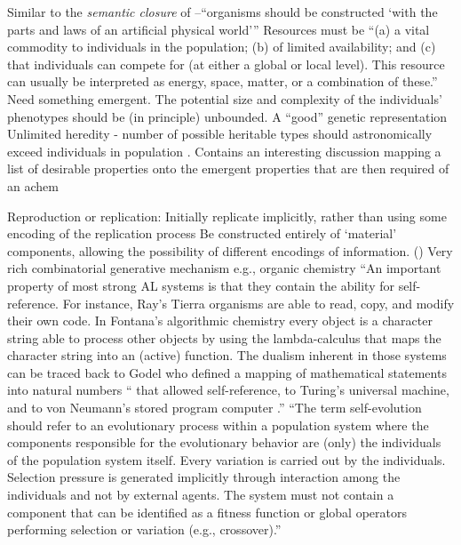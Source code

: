 Similar to the \emph{semantic closure} of \cite{Pattee1995a}--``organisms should be constructed `with the parts and laws of an artificial physical world''' \cite{Taylor2001}
Resources must be ``(a) a vital commodity to individuals in the population; (b) of limited availability; and (c) that individuals can compete for (at either a global or local level). This resource can usually be interpreted as energy, space, matter, or a combination of these.'' \parencite{Taylor2001}
Need something emergent. \parencite{Nellis2014}
The potential size and complexity of the individuals' phenotypes should be (in principle) unbounded.  \parencite{Soros2014}
A ``good'' genetic representation \parencite{Soros2014}
Unlimited heredity - number of possible heritable types should astronomically exceed individuals in population \parencite{Vasas2015}.
Contains an interesting discussion mapping a list of desirable properties onto the emergent properties that are then required of an \gls{achem} \parencite{Faulconbridge2010, Faulconbridge2011}

Reproduction or replication:
Initially replicate implicitly, rather than using some encoding of the replication process  \parencite{Taylor2001}
Be constructed entirely of `material' components, allowing the possibility of different encodings of information. ()
Very rich combinatorial generative mechanism e.g., organic chemistry \parencite{Vasas2015}
``An important property of most strong AL systems is that they contain the ability for self-reference. For instance, Ray's Tierra organisms are able to read, copy, and modify their own code. In Fontana's algorithmic chemistry every object is a character string able to process other objects by using the lambda-calculus that maps the character string into an (active) function. The dualism inherent in those systems can be traced back to Godel who defined a mapping of mathematical statements into natural numbers `` that allowed self-reference, to Turing's universal machine, and to von Neumann's stored program computer .''\parencite{Dittrich1998}
``The term self-evolution should refer to an evolutionary process within a population system where the components responsible for the evolutionary behavior are (only) the individuals of the population
system itself. Every variation is carried out by the individuals. Selection pressure is generated implicitly through interaction among the individuals and not by external agents. The system must not contain a component that can be identified as a fitness function or global operators performing selection or variation (e.g., crossover).'' \cite{Dittrich1998}
	
